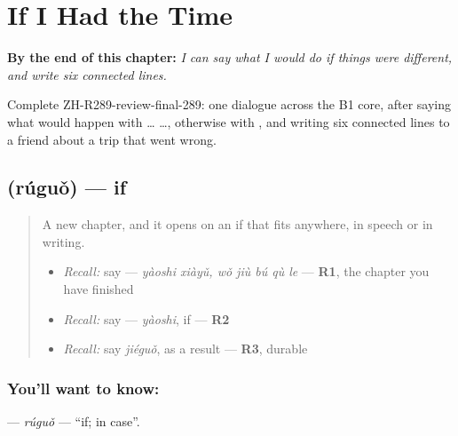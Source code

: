 
\chapter{If I Had the Time}
\label{ch:zh-if-i-had-the-time}

\begin{chapteropening}
\textbf{By the end of this chapter:} \emph{I can say what I would do if things were different, and write six connected lines.}

Complete ZH-R289-review-final-289: one dialogue across the B1 core, after saying what would happen with  …  …, otherwise with , and writing six connected lines to a friend about a trip that went wrong.
\end{chapteropening}

\section[\texorpdfstring{\zh{如果} (rúguǒ)}{如果 (rúguǒ)}]{ (rúguǒ) — if}

\label{lesson:ZH-C289-ruguo}



\begin{quote}
A new chapter, and it opens on an if that fits anywhere, in speech or in writing.

\begin{itemize}
\raggedright
  \item \emph{Recall:} say   — \emph{yàoshi xiàyǔ, wǒ jiù bú qù le} — \textbf{R1}, the chapter you have finished
  \item \emph{Recall:} say  — \emph{yàoshi}, if — \textbf{R2}
  \item \emph{Recall:} say \emph{jiéguǒ}, as a result — \textbf{R3}, durable
\end{itemize}
\end{quote}

\subsection*{You'll want to know: }
\textbf{} — \emph{rúguǒ} — \textquotedblleft{}if; in case\textquotedblright{}.


